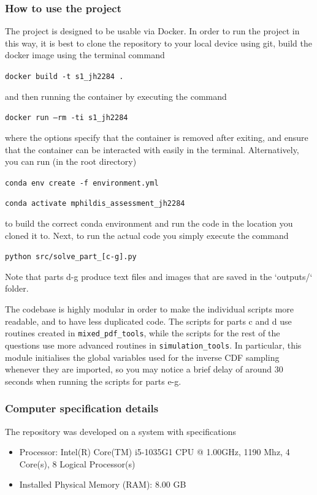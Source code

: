 \documentclass[12pt]{article}
\begin{document}
\subsubsection*{How to use the project}
The project is designed to be usable via Docker. In order to run the project in this way, it is best to clone the repository to your local device using git, build the docker
image using the terminal command

\texttt{docker build -t s1\_jh2284 .}

and then running the container by executing the command

\texttt{docker run --rm -ti s1\_jh2284}

where the options specify that the container is removed after exiting, and ensure that the container can be interacted with easily in the terminal.
Alternatively, you can run (in the root directory)

\texttt{conda env create -f environment.yml}

\texttt{conda activate mphildis\_assessment\_jh2284}

to build the correct conda environment and run the code in the location you cloned it to.
Next, to run the actual code you simply execute the command

\texttt{python src/solve\_part\_[c-g].py}

Note that parts d-g produce text files and images that are saved in the `outputs/` folder.

The codebase is highly modular in order to make the individual scripts more readable, and to have less duplicated code.
The scripts for parts c and d use routines created in \texttt{mixed\_pdf\_tools}, while the scripts for the rest of the questions use more advanced routines in \texttt{simulation\_tools}.
In particular, this module initialises the global variables used for the inverse CDF sampling whenever they are imported, so you may notice a brief delay of around 30 seconds when running the scripts for parts e-g.

\subsubsection*{Computer specification details}

The repository was developed on a system with specifications
\begin{itemize}
  \item Processor: Intel(R) Core(TM) i5-1035G1 CPU @ 1.00GHz, 1190 Mhz, 4 Core(s), 8 Logical Processor(s)
  \item Installed Physical Memory (RAM): 8.00 GB
\end{itemize}
\end{document}
